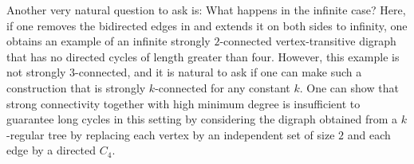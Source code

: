 \documentclass[english,11pt]{article}
\theoremstyle{definition}
\numberwithin{equation}{section}
\numberwithin{figure}{section}
\begin{document}
Another very natural question to ask is: What happens in the infinite case? Here, if one removes the bidirected edges in  and extends it on both sides to infinity, one obtains an example of an infinite strongly $2$-connected vertex-transitive digraph that has no directed cycles of length greater than four. However, this example is not strongly $3$-connected, and it is natural to ask if one can make such a construction that is strongly $k$-connected for any constant $k$.
One can show that strong connectivity together with high minimum degree is insufficient to guarantee long cycles in this setting by considering the digraph obtained from a $k$-regular tree by replacing each vertex by an independent set of size $2$ and each edge by a directed $C_4$.

\end{document}
